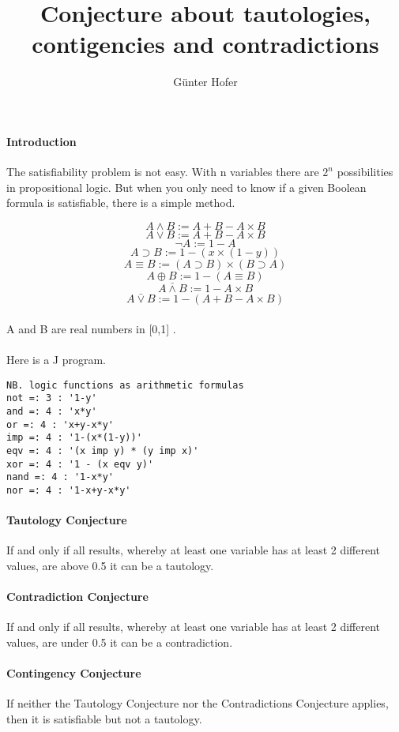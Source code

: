 \documentclass[12pt,a4paper]{article}
\begin{document}
\title{Conjecture about tautologies, contigencies
and contradictions}
\author{Günter Hofer}
\maketitle
\newpage 
\paragraph{Introduction}
The satisfiability problem is not easy. With n variables there are $2^n$ possibilities in propositional logic. But when you only need to know if a given Boolean formula
is satisfiable, there is a simple method.


\[A \land B := A + B - A \times B\]
\[A \lor B 		:= A + B - A \times B\]
\[\lnot A := 1 - A\]
\[A \supset B := 1 - (x \times (1 - y))\]
\[A \equiv B := (A \supset B) \times (B \supset A) \]
\[A \oplus B := 1 - (A \equiv B)\]
\[A \bar{\land} B := 1- A \times B\]
\[A \bar{\lor}B := 1 - (A + B - A \times B)\]
\paragraph{}
A and B are real numbers in [0,1] .
\paragraph{}
Here is a J program.
\begin{verbatim}
NB. logic functions as arithmetic formulas
not =: 3 : '1-y'
and =: 4 : 'x*y'
or =: 4 : 'x+y-x*y'
imp =: 4 : '1-(x*(1-y))'
eqv =: 4 : '(x imp y) * (y imp x)'
xor =: 4 : '1 - (x eqv y)'
nand =: 4 : '1-x*y'
nor =: 4 : '1-x+y-x*y'
\end{verbatim}

\paragraph{Tautology Conjecture}
If and only if all results, whereby at least one variable has at least 2 different values, are above 0.5 it can be a tautology.

\paragraph{Contradiction Conjecture}
If and only if all results, whereby at least one variable has at least 2 different values, are under 0.5 it can be a contradiction.

\paragraph{Contingency Conjecture}
If neither the Tautology Conjecture nor the Contradictions Conjecture applies, then it is satisfiable but not a tautology.
\newpage 
\end{document}

